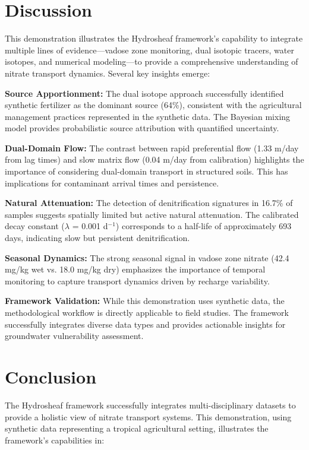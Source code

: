 \documentclass[12pt,a4paper]{article}
\begin{document}
\section{Discussion}

This demonstration illustrates the Hydrosheaf framework's capability to integrate multiple lines of evidence—vadose zone monitoring, dual isotopic tracers, water isotopes, and numerical modeling—to provide a comprehensive understanding of nitrate transport dynamics. Several key insights emerge:

\textbf{Source Apportionment:} The dual isotope approach successfully identified synthetic fertilizer as the dominant source (64\%), consistent with the agricultural management practices represented in the synthetic data. The Bayesian mixing model provides probabilistic source attribution with quantified uncertainty.

\textbf{Dual-Domain Flow:} The contrast between rapid preferential flow (1.33 m/day from lag times) and slow matrix flow (0.04 m/day from calibration) highlights the importance of considering dual-domain transport in structured soils. This has implications for contaminant arrival times and persistence.

\textbf{Natural Attenuation:} The detection of denitrification signatures in 16.7\% of samples suggests spatially limited but active natural attenuation. The calibrated decay constant ($\lambda$ = 0.001 d$^{-1}$) corresponds to a half-life of approximately 693 days, indicating slow but persistent denitrification.

\textbf{Seasonal Dynamics:} The strong seasonal signal in vadose zone nitrate (42.4 mg/kg wet vs. 18.0 mg/kg dry) emphasizes the importance of temporal monitoring to capture transport dynamics driven by recharge variability.

\textbf{Framework Validation:} While this demonstration uses synthetic data, the methodological workflow is directly applicable to field studies. The framework successfully integrates diverse data types and provides actionable insights for groundwater vulnerability assessment.

\section{Conclusion}

The Hydrosheaf framework successfully integrates multi-disciplinary datasets to provide a holistic view of nitrate transport systems. This demonstration, using synthetic data representing a tropical agricultural setting, illustrates the framework's capabilities in:
\end{document}
